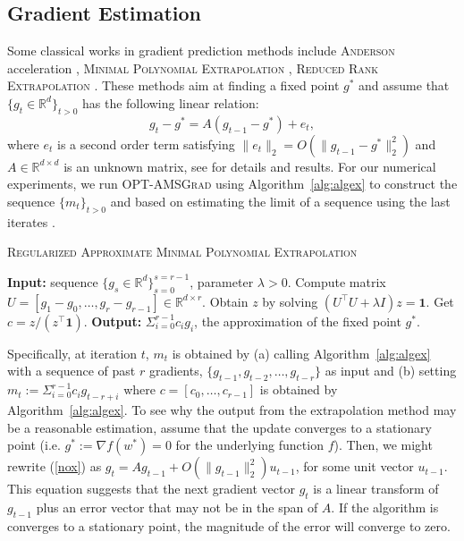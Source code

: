 \documentclass[11pt]{article}
\theoremstyle{k}
\begin{document}
\subsection{Gradient Estimation}
Some classical works in gradient prediction methods include \textsc{Anderson} acceleration \citep{WN11}, \textsc{Minimal Polynomial Extrapolation} \citep{CJ76},  \textsc{Reduced Rank Extrapolation} \citep{E79}.
These methods aim at finding a fixed point $g^{*}$ and assume that $\{g_t \in \mathbb R^d\}_{t>0} $ has the following linear relation:\vspace{-0.1cm}
\begin{equation} \label{nox}
g_t - g^* = A( g_{t-1} - g^* ) + e_t,
\end{equation}
where $e_t$ is a second order term satisfying $\| e_t \|_2  = O( \| g_{t-1} - g^* \|_2^2)$ and $A \in \mathbb R^{d \times d}$ is an unknown matrix, see \citep{SAB16} for details and results.
For our numerical experiments, we run \textsc{OPT-AMSGrad} using Algorithm~\ref{alg:algex} to construct the sequence $\{m_t\}_{t>0}$ and based on estimating the limit of a sequence using the last iterates \citep{BZ13}.
\begin{algorithm}[h]
\begin{algorithmic}[1] 
\small
\caption{\textsc{Regularized Approximate Minimal Polynomial Extrapolation}
\citep{SAB16} } \label{alg:algex}
\STATE \textbf{Input:} sequence $\{ g_s \in \mathbb R^d \}_{s=0}^{s=r-1}$, parameter $\lambda > 0$.
\STATE Compute matrix  $U = [ g_1 - g_0, \dots, g_{r} - g_{r-1}] \in \mathbb R^{d \times r}$.
\STATE Obtain $z$ by solving $(U^\top U + \lambda I ) z = \mathbf{1}$.
\STATE Get $c= z / (z^\top \mathbf{1})$.
\STATE \textbf{Output:} $\Sigma_{i=0}^{r-1} c_i g_i$, the approximation of the fixed point $g^*$.
\end{algorithmic}
\end{algorithm}
Specifically, at iteration $t$, $m_t$ is obtained by \textsf{(a)} calling Algorithm~\ref{alg:algex} with a sequence of past $r$ gradients, $\{ g_{t-1},g_{t-2}, \dots, g_{t-r} \}$ as input and \textsf{(b)} setting $m_t:= \Sigma_{i=0}^{r-1} c_i g_{t-r+i}$ where $c = [c_0, \dots, c_{r-1}] $ is obtained by Algorithm~\ref{alg:algex}.
To see why the output from the extrapolation method may be a reasonable estimation, assume that the update converges to a stationary point (i.e. $g^*:=\nabla f(w^*) = 0$ for the underlying function $f$). Then, we might rewrite (\ref{nox}) as $g_t = A g_{t-1}  + O( \| g_{t-1} \|_2^2 ) u_{t-1}$, for some unit vector $u_{t-1}$.
This equation suggests that the next gradient vector $g_{t}$ is a linear transform of $g_{{t-1}}$ plus an error vector that may not be in the span of $A$.
If the algorithm is converges to a stationary point, the magnitude of the error will converge to zero.
\end{document}
